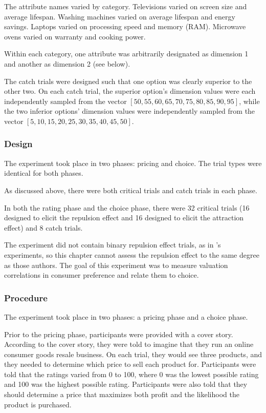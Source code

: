 The attribute names varied by category. Televisions varied on screen size and average lifespan. Washing machines varied on average lifespan and energy savings. Laptops varied on processing speed and memory (RAM). Microwave ovens varied on warranty and cooking power. 

Within each category, one attribute was arbitrarily designated as dimension 1 and another as dimension 2 (see below). 

The catch trials were designed such that one option was clearly superior to the other two. On each catch trial, the superior option's dimension values were each independently sampled from the vector $[50,55,60,65,70,75,80,85,90,95]$, while the two inferior options' dimension values were independently sampled from the vector $[5,10,15,20,25,30,35,40,45,50]$. 

\subsubsection{Design}

The experiment took place in two phases: pricing and choice. The trial types were identical for both phases.

As discussed above, there were both critical trials and catch trials in each phase. 

In both the rating phase and the choice phase, there were 32 critical trials (16 designed to elicit the repulsion effect and 16 designed to elicit the attraction effect) and 8 catch trials.

The experiment did not contain binary repulsion effect trials, as in \textcite{banerjeeFactorsThatPromote2024}'s experiments, so this chapter cannot assess the repulsion effect to the same degree as those authors. The goal of this experiment was to measure valuation correlations in consumer preference and relate them to choice.

\subsubsection{Procedure}

The experiment took place in two phases: a pricing phase and a choice phase.

Prior to the pricing phase, participants were provided with a cover story. According to the cover story, they were told to imagine that they run an online consumer goods resale business. On each trial, they would see three products, and they needed to determine which price to sell each product for. Participants were told that the ratings varied from 0 to 100, where 0 was the lowest possible rating and 100 was the highest possible rating. Participants were also told that they should determine a price that maximizes both profit and the likelihood the product is purchased. 

